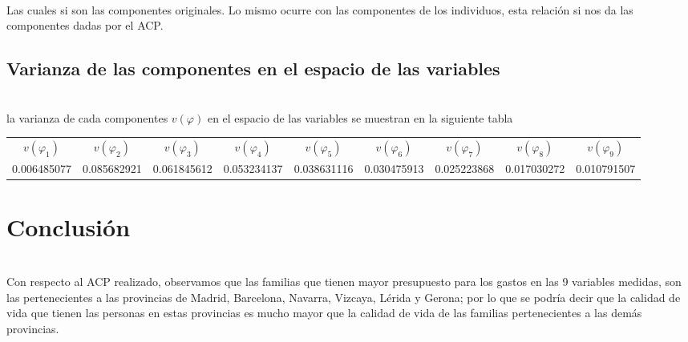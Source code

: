 \documentclass[report,oneside]{revcoles}
\begin{document}
~\\Las cuales si son las componentes originales. Lo mismo ocurre con las componentes de los individuos, esta relación si nos da las componentes dadas por el ACP.

\subsection{Varianza de las componentes en el espacio de las variables}
~\\la varianza de cada componentes $v(\varphi)$ en el espacio de las variables se muestran en la siguiente tabla
\begin{center}
\resizebox{17cm}{!} {
\begin{tabular}{|ccccccccc|}
\hline 
$v(\varphi_1)$ & $v(\varphi_2)$ & $v(\varphi_3)$ & $v(\varphi_4)$ & $v(\varphi_5)$ & $v(\varphi_6)$ & $v(\varphi_7)$ & $v(\varphi_8)$ & $v(\varphi_9)$ \\ 
0.006485077 & 0.085682921 & 0.061845612 & 0.053234137 & 0.038631116 & 0.030475913 & 0.025223868 & 0.017030272 & 0.010791507 \\ 
\hline 
\end{tabular} 
}
\end{center}


\section{Conclusión}
~\\Con respecto al ACP realizado, observamos que las familias que tienen mayor presupuesto para los gastos en las 9 variables medidas, son las pertenecientes a las provincias de Madrid, Barcelona, Navarra, Vizcaya, Lérida y Gerona; por lo que se podría decir que la calidad de vida que tienen las personas en estas provincias es mucho mayor que la calidad de vida de las familias pertenecientes a las demás provincias.





    \appendix%


\end{document}
